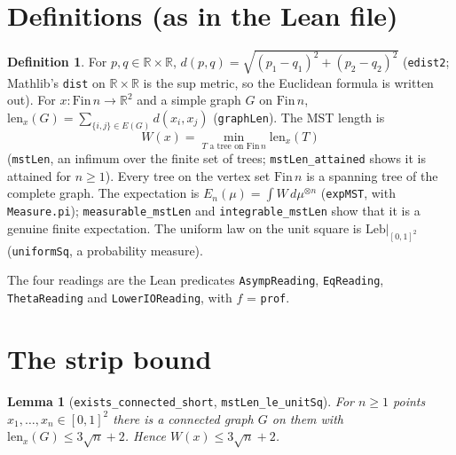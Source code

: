 \documentclass[11pt]{article}
\newtheorem{lemma}[theorem]{Lemma}
\theoremstyle{definition}
\newtheorem{definition}[theorem]{Definition}
\begin{document}
\section{Definitions (as in the Lean file)}

\begin{definition}
For $p,q\in\mathbb{R}\times\mathbb{R}$, $d(p,q)=\sqrt{(p_1-q_1)^2+(p_2-q_2)^2}$ (\texttt{edist2};
Mathlib's \texttt{dist} on $\mathbb{R}\times\mathbb{R}$ is the sup metric, so the Euclidean formula
is written out). For $x:\mathrm{Fin}\,n\to\mathbb{R}^2$ and a simple graph $G$ on $\mathrm{Fin}\,n$,
$\mathrm{len}_x(G)=\sum_{\{i,j\}\in E(G)} d(x_i,x_j)$ (\texttt{graphLen}). The MST length is
\[ W(x)=\min_{T \text{ a tree on } \mathrm{Fin}\,n} \mathrm{len}_x(T) \]
(\texttt{mstLen}, an infimum over the finite set of trees; \texttt{mstLen\_attained} shows it is
attained for $n\ge1$). Every tree on the vertex set $\mathrm{Fin}\,n$ is a spanning tree of the
complete graph. The expectation is $E_n(\mu)=\int W\,d\mu^{\otimes n}$ (\texttt{expMST}, with
\texttt{Measure.pi}); \texttt{measurable\_mstLen} and \texttt{integrable\_mstLen} show that it is
a genuine finite expectation. The uniform law on the unit square is
$\mathrm{Leb}|_{[0,1]^2}$ (\texttt{uniformSq}, a probability measure).
\end{definition}

The four readings are the Lean predicates \texttt{AsympReading}, \texttt{EqReading},
\texttt{ThetaReading} and \texttt{LowerIOReading}, with $f$ = \texttt{prof}.

\section{The strip bound}

\begin{lemma}[\texttt{exists\_connected\_short}, \texttt{mstLen\_le\_unitSq}]
For $n\ge1$ points $x_1,\dots,x_n\in[0,1]^2$ there is a connected graph $G$ on them with
$\mathrm{len}_x(G)\le 3\sqrt n+2$. Hence $W(x)\le 3\sqrt n+2$.
\end{lemma}
\end{document}
